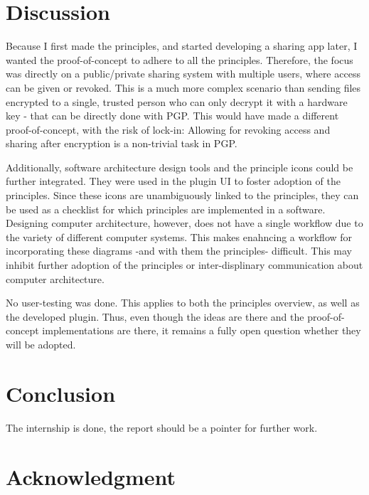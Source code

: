 \documentclass[journal, dvipsnames]{IEEEtran}
\begin{document}
\section{Discussion}


Because I first made the principles, and started developing a sharing app later, I wanted the proof-of-concept to adhere to all the principles. Therefore, the focus was directly on a public/private sharing system with multiple users, where access can be given or revoked. This is a much more complex scenario than sending files encrypted to a single, trusted person who can only decrypt it with a hardware key - that can be directly done with PGP. This would have made a different proof-of-concept, with the risk of lock-in: Allowing for revoking access and sharing after encryption is a non-trivial task in PGP.


Additionally, software architecture design tools and the principle icons could be further integrated. They were used in the plugin UI to foster adoption of the principles. Since these icons are unambiguously linked to the principles, they can be used as a checklist for which principles are implemented in a software. Designing computer architecture, however, does not have a single workflow due to the variety of different computer systems. This makes enahncing a workflow for incorporating these diagrams -and with them the principles- difficult. This may inhibit further adoption of the principles or inter-displinary communication about computer architecture.

No user-testing was done. This applies to both the principles overview, as well as the developed plugin. Thus, even though the ideas are there and the proof-of-concept implementations are there, it remains a fully open question whether they will be adopted.

\section{Conclusion}

The internship is done, the report should be a pointer for further work.

\section*{Acknowledgment}
\end{document}
